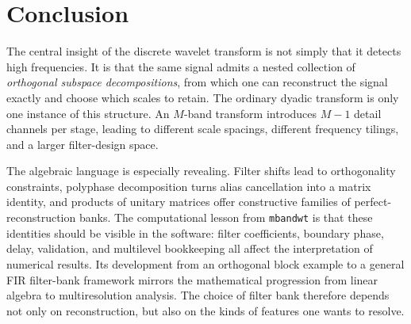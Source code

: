 \documentclass{article}
\theoremstyle{definition}
\theoremstyle{remark}
\begin{document}
\section{Conclusion}
The central insight of the discrete wavelet transform is not simply that it detects high frequencies. It is that the same signal admits a nested collection of \emph{orthogonal subspace decompositions}, from which one can reconstruct the signal exactly and choose which scales to retain. The ordinary dyadic transform is only one instance of this structure. An $M$-band transform introduces $M-1$ detail channels per stage, leading to different scale spacings, different frequency tilings, and a larger filter-design space.

The algebraic language is especially revealing. Filter shifts lead to orthogonality constraints, polyphase decomposition turns alias cancellation into a matrix identity, and products of unitary matrices offer constructive families of perfect-reconstruction banks. The computational lesson from \texttt{mbandwt} is that these identities should be visible in the software: filter coefficients, boundary phase, delay, validation, and multilevel bookkeeping all affect the interpretation of numerical results. Its development from an orthogonal block example to a general FIR filter-bank framework mirrors the mathematical progression from linear algebra to multiresolution analysis. The choice of filter bank therefore depends not only on reconstruction, but also on the kinds of features one wants to resolve.
\end{document}
